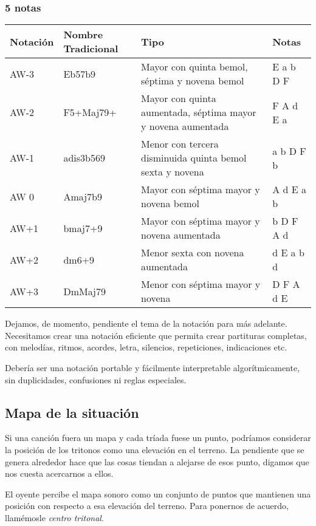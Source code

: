 \documentclass[]{report}
\begin{document}
\subsubsection*{5 notas}
\begin{table}[H]
  \centering
  \begin{tabularx}{\textwidth}{ll>{\raggedright\arraybackslash}Xl}
\toprule
Notación & Nombre Tradicional & Tipo & Notas \\
\midrule
\textsf{AW-3} & Eb57b9    & Mayor con quinta bemol, séptima y novena bemol & E a b D F\\
\textsf{AW-2} & F5+Maj79+ & Mayor con quinta aumentada, séptima mayor y novena aumentada & F A d E a\\
\textsf{AW-1} & adis3b569 & Menor con tercera disminuida quinta bemol sexta y novena & a b D F b\\
\textsf{AW 0} & Amaj7b9   & Mayor con séptima mayor y novena bemol & A d E a b\\
\textsf{AW+1} & bmaj7+9   & Mayor con séptima mayor y novena aumentada & b D F A d\\
\textsf{AW+2} & dm6+9     & Menor sexta con novena aumentada & d E a b d\\
\textsf{AW+3} & DmMaj79   & Menor con séptima mayor y novena & D F A d E\\ 
\bottomrule
\end{tabularx}
\end{table}

Dejamos, de momento, pendiente el tema de la notación para más adelante.  Necesitamos crear una notación eficiente que permita crear partituras completas, con melodías, ritmos, acordes, letra, silencios, repeticiones, indicaciones etc.

Debería ser una notación portable y fácilmente interpretable algorítmicamente, sin duplicidades, confusiones ni reglas especiales. 

\subsection{Mapa de la situación}

Si una canción fuera un mapa y cada tríada fuese un punto, podríamos considerar la posición de los tritonos como una elevación en el terreno. La pendiente que se genera alrededor hace que las cosas tiendan a alejarse de esos punto, digamos que nos cuesta acercarnos a ellos.

El oyente percibe el mapa sonoro como un conjunto de puntos que mantienen una posición con respecto a esa elevación del terreno. Para ponernos de acuerdo, llamémosle \emph{centro tritonal}.
\end{document}
